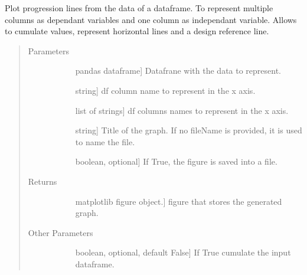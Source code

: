 \documentclass[letterpaper,10pt,english]{sphinxmanual}
\begin{document}
\begin{fulllineitems}
\label{\detokenize{rstFiles/progressPlot:progressPlot.progressPlot}}
Plot progression lines from the data of a dataframe. 
To represent multiple columns as dependant variables 
and one column as independant variable. 
Allows to cumulate values, represent horizontal lines and
a design reference line.
\begin{quote}\begin{description}
\item[{Parameters}] \leavevmode\begin{description}
\item[{}] \leavevmode{[}pandas dataframe{]}
Datafrane with the data to represent.

\item[{}] \leavevmode{[}string{]}
df column name to represent in the x axis.

\item[{}] \leavevmode{[}list of strings{]}
df columns names to represent in the x axis.

\item[{}] \leavevmode{[}string{]}
Title of the graph.
If no fileName is provided, it is used to name the file.

\item[{}] \leavevmode{[}boolean, optional{]}
If True, the figure is saved into a file.

\end{description}

\item[{Returns}] \leavevmode\begin{description}
\item[{}] \leavevmode{[}matplotlib figure object.{]}
figure that stores the generated graph.

\end{description}

\item[{Other Parameters}] \leavevmode\begin{description}
\item[{}] \leavevmode{[}boolean, optional, default False{]}
If True cumulate the input dataframe.


\end{description}
\end{description}
\end{quote}
\end{fulllineitems}
\end{document}
